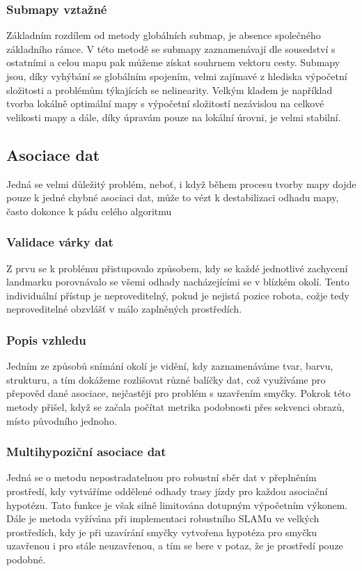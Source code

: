 \documentclass[11pt]{article}
\begin{document}
\subsubsection{Submapy vztažné}
Základním rozdílem od metody globálních submap, je absence společného základního rámce. V této metodě se submapy zaznamenávají dle sousedství s ostatními a celou mapu pak můžeme získat souhrnem vektoru cesty. Submapy jsou, díky vyhýbání se globálním spojením, velmi zajímavé z hlediska výpočetní složitosti a problémům týkajících se nelinearity. Velkým kladem je například tvorba lokálně optimální mapy s výpočetní složitostí nezávislou na celkové velikosti mapy a dále, díky úpravám pouze na lokální úrovni, je velmi stabilní.

\subsection{Asociace dat}
Jedná se velmi důležitý problém, neboť, i když během procesu tvorby mapy dojde pouze k jedné chybné asociaci dat, může to vézt k destabilizaci odhadu mapy, často dokonce k pádu celého algoritmu

\subsubsection{Validace várky dat}
Z prvu se k problému přistupovalo způsobem, kdy se každé jednotlivé zachycení landmarku porovnávalo se všemi odhady nacházejícími se v blízkém okolí. Tento individuální přístup je neproveditelný, pokud je nejistá pozice robota, cožje tedy neproveditelné obzvlášť v málo zaplněných prostředích. 

\subsubsection{Popis vzhledu}
Jedním ze způsobů snímání okolí je vidění, kdy zaznamenáváme tvar, barvu, strukturu, a tím dokážeme rozlišovat různé balíčky dat, což využíváme pro přepověd dané asociace, nejčastěji pro problém s uzavřením smyčky. Pokrok této metody přišel, když se začala počítat metrika podobnosti přes sekvenci obrazů, místo původního jednoho. 

\subsubsection{Multihypoziční asociace dat}
Jedná se o metodu nepostradatelnou pro robustní sběr dat v přeplněním prostředí, kdy vytváříme oddělené odhady trasy jízdy pro každou asociační hypotézu. Tato funkce je však silně limitována dotupným výpočetním výkonem. Dále je metoda vyžívána při implementaci robustního SLAMu ve velkých prostředích, kdy je při uzavírání smyčky vytvořena hypotéza pro smyčku uzavřenou i pro stále neuzavřenou, a tím se bere v potaz, že je prostředí pouze podobné. 
\end{document}
